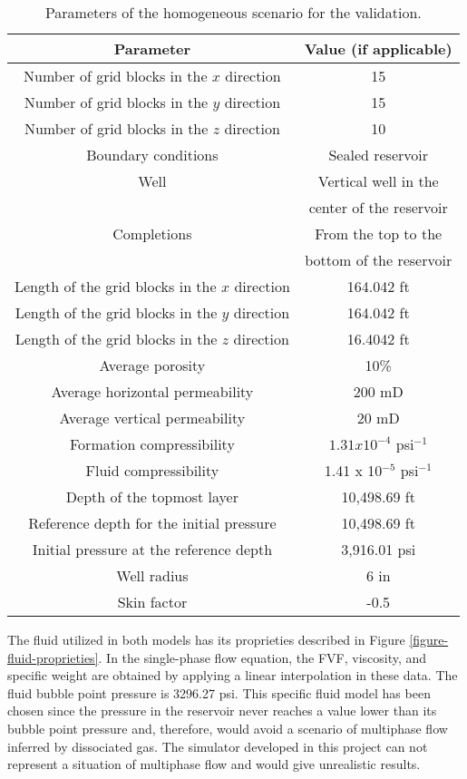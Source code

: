 \begin{table}[htbp]
	\small
	\centering
	\caption{Parameters of the homogeneous scenario for the validation.}
	\label{table-parameters-for-the-homogeneous-validation-model}
	\begin{tabular}{c c}
		\toprule
		Parameter & Value (if applicable)\\
		\midrule
		Number of grid blocks in the $x$ direction & 15\\
		Number of grid blocks in the $y$ direction & 15\\
		Number of grid blocks in the $z$ direction & 10\\
		Boundary conditions & Sealed reservoir \\
		Well & Vertical well in the\\
		& center of the reservoir\\
		Completions & From the top to the\\
		& bottom of the reservoir\\
		Length of the grid blocks in the $x$ direction & 164.042 ft\\
		Length of the grid blocks in the $y$ direction & 164.042 ft\\
		Length of the grid blocks in the $z$ direction & 16.4042 ft\\
		Average porosity & 10\%\\
		Average horizontal permeability & 200 mD\\
		Average vertical permeability & 20 mD\\
		Formation compressibility & $1.31 x 10^{-4}$ psi$^{-1}$\\
		Fluid compressibility &  1.41 x 10$^{-5}$ psi$^{-1}$\\
		Depth of the topmost layer & 10,498.69 ft\\
		Reference depth for the initial pressure & 10,498.69 ft\\
		Initial pressure at the reference depth & 3,916.01 psi\\
		Well radius & 6 in\\
		Skin factor & -0.5\\
		\bottomrule
	\end{tabular}
\end{table}

The fluid utilized in both models has its proprieties described in Figure \ref{figure-fluid-proprieties}.
%
In the single-phase flow equation, the FVF, viscosity, and specific weight are obtained by applying a linear interpolation in these data.
%
The fluid bubble point pressure is 3296.27 psi.
%
This specific fluid model has been chosen since the pressure in the reservoir never reaches a value lower than its bubble point pressure and, therefore, would avoid a scenario of multiphase flow inferred by dissociated gas.
%
The simulator developed in this project can not represent a situation of multiphase flow and would give unrealistic results.

